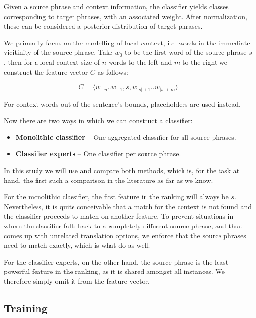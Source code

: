 \documentclass[smallextended]{svjour3}       %
\theoremstyle{break}
\begin{document}
Given a source phrase and context information, the classifier yields classes
corresponding to target phrases, with an associated weight. After
normalization, these can be considered a posterior distribution of
target phrases. 

We primarily focus on the modelling of local context, i.e. words in the
immediate vicitinity of the source phrase. Take $w_0$ to be the first word of
the source phrase $s$, then for a local context size of $n$ words to the left and
$m$ to the right we construct the feature vector $C$ as follows:

\begin{equation}
  C = \langle w_{-n} .. w_{-1} , s , w_{|s|+1} .. w_{|s|+m} \rangle
\end{equation}

For context words out of the sentence's bounds, placeholders are used instead.

Now there are two ways in which we can construct a classifier:

\begin{itemize}
  \item \textbf{Monolithic classifier} -- One aggregated classifier for all
    source phrases.
  \item \textbf{Classifier experts} -- One classifier per source phrase.
\end{itemize}

In this study we will use and compare both methods, which is, for the task at
hand, the first such a comparison in the literature as far as we know.

For the monolithic classifier, the first feature in the ranking will always be
$s$. Nevertheless, it is quite conceivable that a match for the context is not
found and the classifier proceeds to match on another feature. To prevent
situations in where the classifier falls back to a completely different source
phrase, and thus comes up with unrelated translation options, we enforce that
the source phrases need to match exactly, which is what \cite{Stroppa+07} do as
well.

For the classifier experts, on the other hand, the source phrase is the least
powerful feature in the ranking, as it is shared amongst all instances. We
therefore simply omit it from the feature vector.

\subsection{Training}
\end{document}
